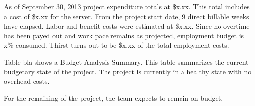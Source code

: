 




As of September 30, 2013 project expenditure totals at \$x.xx. This total includes a cost of \$x.xx for the server. From the project start date, 9 direct billable weeks have elapsed. Labor and benefit costs were estimated at \$x.xx. Since no overtime has been payed out and work pace remains as projected, employment budget is x\% consumed. Thirst turns out to be \$x.xx of the total employment costs. 


Table bla shows a Budget Analysis Summary. This table summarizes the current budgetary state of the project. The project is currently in a healthy state with no overhead costs. 


For the remaining of the project, the team expects to remain on budget.

